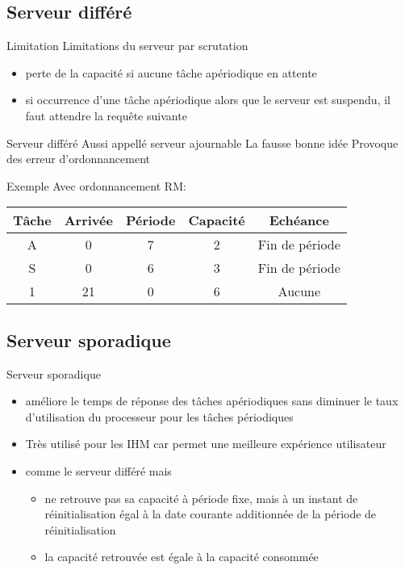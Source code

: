 \subsection{Serveur différé}

\begin{frame}{Limitation} 
  Limitations du serveur par scrutation 
  \begin{itemize}
  \item perte de la capacité si aucune tâche apériodique en attente
  \item si occurrence d'une tâche apériodique alors que le serveur est
    suspendu, il faut attendre la requête suivante
  \end{itemize}
\end{frame} 

\begin{frame}{Serveur différé}
  Aussi appellé serveur ajournable
  La fausse bonne idée
  Provoque des erreur d'ordonnancement
\end{frame}

\begin{frame}{Exemple}
  Avec ordonnancement RM:
  \begin{center}
    \begin{tabular}{ccccc}
      \hline
      Tâche & Arrivée & Période & Capacité & Echéance \\
      \hline
      A & 0 &  7 & 2 & Fin de période\\
      S & 0 &  6 & 3 & Fin de période\\
      1 & 21 & 0 & 6 & Aucune\\
      \hline
    \end{tabular}

    
  \end{center}
\end{frame} 

\subsection{Serveur sporadique}

\begin{frame}{Serveur sporadique}
  \begin{itemize}
  \item  améliore le  temps de  réponse des  tâches  apériodiques sans
    diminuer  le  taux d'utilisation  du  processeur  pour les  tâches
    périodiques
  \item Très utilisé pour les  IHM car permet une meilleure expérience
    utilisateur
  \item comme le serveur différé mais 
    \begin{itemize}
    \item  ne retrouve  pas  sa capacité  à  période fixe,  mais à  un
      instant de réinitialisation égal  à la date courante additionnée
      de la période de réinitialisation
      \item la capacité retrouvée est égale à la capacité consommée 
      \end{itemize}
    \end{itemize}
\end{frame} 

